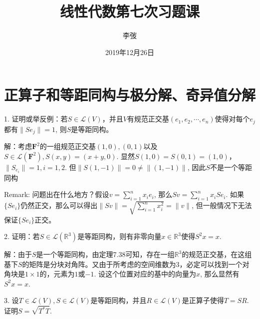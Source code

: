 \documentclass[hyperref,]{ctexart}
\title{线性代数第七次习题课}
\author{李弢}
\date{2019年12月26日}
\begin{document}
\maketitle

{
\setcounter{tocdepth}{2}
\tableofcontents
}
\def\vec{\overrightarrow} \def\bfF{\mathbf{F}} \def\calP{\mathcal{P}}
\def\calC{\mathcal{C}} \def\calL{\mathcal{L}} \def\calM{\mathcal{M}}
\def\R{\mathbb{R}} \def\C{\mathbb{C}} \def\N{\mathbb{N}}
\def\Z{\mathbb{Z}} \def\span{\mathrm{span}\,} \def\dim{\mathrm{dim}\,}
\def\Null{\mathrm{null}\,} \def\range{\mathrm{range}\,}
\def\trace{\mathrm{trace}\,} \def\rank{\mathrm{rank}\,}
\def\proj{\mathrm{Proj}\,} \def\st{\mathrm{s.t.}} \def\d{\mathrm{d}\,}

\section{正算子和等距同构与极分解、奇异值分解}\label{ux6b63ux7b97ux5b50ux548cux7b49ux8dddux540cux6784ux4e0eux6781ux5206ux89e3ux5947ux5f02ux503cux5206ux89e3}

\noindent{} 1.
证明或举反例：若\(S\in\calL(V)\)，并且\(V\)有规范正交基\((e_1,e_2,\cdots,e_n)\)使得对每个\(e_j\)都有\(\|Se_j\|=1\),
则\(S\)是等距同构。

\smallskip

\noindent{}
解：考虑\(\bfF^2\)的一组规范正交基\((1,0),(0,1)\)以及\(S\in\calL(\bfF^2), S(x,y)=(x+y,0)\).
显然\(S(1,0)=S(0,1)=(1,0)\)，\(\|S_{e_i}\|=1,i=1,2\).
但\(\|S(1,-1)\|=0\ne\|(1,-1)\|\), 因此\(S\)不是一个等距同构

\smallskip

\noindent{} Remark: 问题出在什么地方？假设\(v= \sum_{i=1}^nx_ie_i\),
那么\(Sv = \sum_{i=1}^n x_i Se_i\).
如果\(\{Se_i\}\)仍然正交，那么可以得出\(\|Sv\| = \sqrt{\sum_{i=1}^nx_i^2}=\|v\|\),
但一般情况下无法保证\(\{Se_i\}\)正交。

\bigskip

\noindent{} 2.
证明：若\(S\in\calL(\R^3)\)是等距同构，则有非零向量\(x\in\R^3\)使得\(S^2x=x\).

\smallskip

\noindent{}
解：由于\(S\)是一个等距同构，由定理7.38可知，存在一组\(\R^3\)的规范正交基，在这组基下\(S\)的矩阵是分块对角阵。又由于所考虑的空间维数为3，必定可以找到一个对角块是\(1\times 1\)的，元素为\(1\)或\(-1\).
设这个位置对应的基中的向量为\(x\), 那么显然有\(S^2 x=x\).

\bigskip 

\noindent{} 3.
设\(T\in\calL(V),S\in\calL(V)\)是等距同构，并且\(R\in\calL(V)\)是正算子使得\(T=SR\).
证明\(S=\sqrt{T^*T}\). \smallskip
\end{document}
